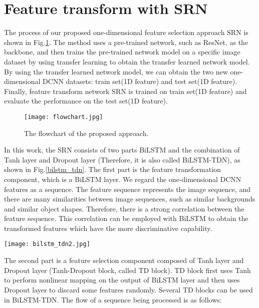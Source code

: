 \documentclass[10pt,twocolumn,letterpaper]{article}
\begin{document}
 				

\section{Feature transform with SRN}
The process of our proposed one-dimensional feature selection approach SRN is shown in Fig.\ref{flowchart}. The method uses a pre-trained network, such as ResNet, as the backbone, and then trains the pre-trained network model on a specific image dataset by using transfer learning to obtain the transfer learned network model. By using the transfer learned network model, we can obtain the two new one-dimensional DCNN datasets: train set(1D feature) and test set(1D feature). Finally, feature transform network SRN is trained on train set(1D feature) and evaluate the performance on the test set(1D feature).			
\begin{figure}[htbp]
	\centering
	\texttt{[image: flowchart.jpg]}
	\caption{The flowchart of the proposed approach.}\label{flowchart}
\end{figure}	

In this work, the SRN consists of two parts BiLSTM and the combination of Tanh layer and Dropout layer (Therefore, it is also called BiLSTM-TDN), as shown in Fig.\ref{bilstm_tdn}. The first part is the feature transformation component, which is a BiLSTM layer. We regard the one-dimensional DCNN features as a sequence. The feature sequence represents the image sequence, and there are many similarities between image sequences, such as similar backgrounds and similar object shapes. Therefore, there is a strong correlation between the feature sequence. This correlation can be employed with BiLSTM to obtain the transformed features which have the more discriminative capability.	
\begin{figure*}[htbp]
	\begin{center}
		\texttt{[image: bilstm\_tdn2.jpg]}
	\end{center}
	\caption{The proposed SRN, called BiLSTM-TDN.}
	\label{bilstm_tdn}
\end{figure*}							
The second part is a feature selection component composed of Tanh layer and Dropout layer (Tanh-Dropout block, called TD block). TD block first uses Tanh to perform nonlinear mapping on the output of BiLSTM layer and then uses Dropout layer to discard some features randomly. Several TD blocks can be used in BiLSTM-TDN. The flow of a sequence  being processed is as follows:
	
\end{document}
